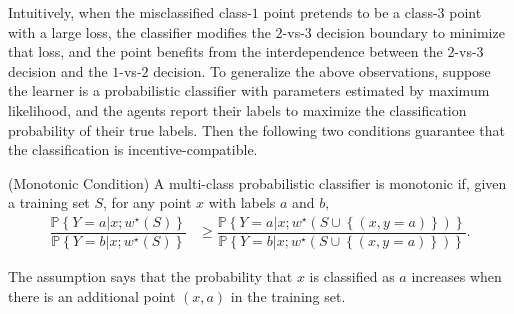\documentclass{article}
\begin{document}
\begin{figure}[H] \centering {} \label{fig:1dam}
\end{figure}
Intuitively, when the misclassified class-$1$ point pretends to be a class-$3$ point with a large loss, the classifier modifies the $2$-vs-$3$ decision boundary to minimize that loss, and the point benefits from the interdependence between the $2$-vs-$3$ decision and the $1$-vs-$2$ decision.
\newline \newline
To generalize the above observations, suppose the learner is a probabilistic classifier with parameters estimated by maximum likelihood, and the agents report their labels to maximize the classification probability of their true labels. Then the following two conditions guarantee that the classification is incentive-compatible.
\newline \newline
\begin{df} \label{df:mono} 
(Monotonic Condition) A multi-class probabilistic classifier is monotonic if, given a training set $S $, for any point $x $ with labels $a $ and $b, $
\begin{align*}
\dfrac{\mathbb{P}\left\{Y = a | x ; w^\star \left(S\right)\right\}}{\mathbb{P}\left\{Y = b | x ; w^\star \left(S\right)\right\}} &\geq  \dfrac{\mathbb{P}\left\{Y = a | x ; w^\star \left(S \cup \left\{\left(x, y = a\right)\right\}\right)\right\}}{\mathbb{P}\left\{Y = b | x ; w^\star \left(S \cup \left\{\left(x, y = a\right)\right\}\right)\right\}}.
\end{align*}\end{df}
The assumption says that the probability that $x $ is classified as $a $ increases when there is an additional point $\left(x , a \right)$ in the training set.
\newline \newline
\end{document}
